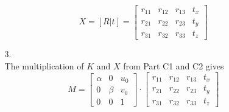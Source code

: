 \documentclass[12pt]{report}
\begin{document}
\begin{enumerate}
\begin{enumerate}
    $$
    X = [R | t]
    =
    \left[\begin{array}{ccc|c}
    r_{11} & r_{12} & r_{13} & t_x \\
    r_{21} & r_{22} & r_{23} & t_y \\
    r_{31} & r_{32} & r_{33} & t_z
    \end{array} \right]
    $$
    
    \item[3.]
    \ \\
    The multiplication of $K$ and $X$ from Part C1 and C2 gives
    $$
    M = \begin{bmatrix}
    \alpha & 0 & u_0 \\
    0 & \beta & v_0 \\
    0 & 0 & 1
    \end{bmatrix}
    \cdot
    \begin{bmatrix}
    r_{11} & r_{12} & r_{13} & t_x \\
    r_{21} & r_{22} & r_{23} & t_y \\
    r_{31} & r_{32} & r_{33} & t_z
    \end{bmatrix}
    $$


\end{enumerate}
\end{enumerate}
\end{document}
